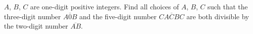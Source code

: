 $A$, $B$, $C$ are one-digit positive integers. Find all choices of $A$, $B$, $C$ such that the three-digit number $\overline{A0B}$ and the five-digit number $\overline{CACBC}$ are both divisible by the two-digit number $\overline{AB}$.
